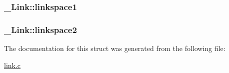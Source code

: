 \subsubsection[{\texorpdfstring{linkspace1}{linkspace1}}]{ \+\_\+\+Link\+::linkspace1}\hypertarget{struct__Link_a851b2cb675c25aaa73ebbaa58b8db1a2}{}\label{struct__Link_a851b2cb675c25aaa73ebbaa58b8db1a2}
\subsubsection[{\texorpdfstring{linkspace2}{linkspace2}}]{ \+\_\+\+Link\+::linkspace2}\hypertarget{struct__Link_aac79e76abc5512cd08a381eb835d59f0}{}\label{struct__Link_aac79e76abc5512cd08a381eb835d59f0}


The documentation for this struct was generated from the following file\+:\begin{DoxyCompactItemize}
\item 
\hyperlink{link_8c}{link.\+c}\end{DoxyCompactItemize}

